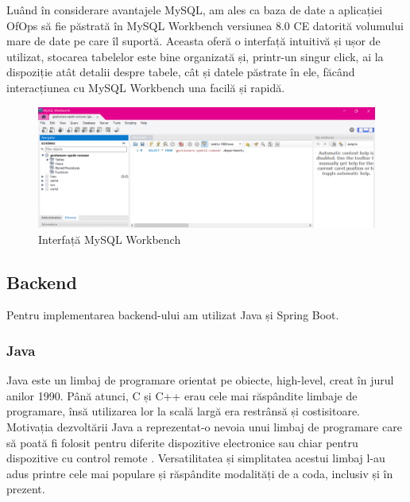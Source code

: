 Luând în considerare avantajele MySQL, am ales ca baza de date a aplicației OfOps să fie păstrată în MySQL Workbench versiunea 8.0 CE datorită volumului mare de date pe care îl suportă. Aceasta oferă o interfață intuitivă și ușor de utilizat, stocarea tabelelor este bine organizată și, printr-un singur click, ai la dispoziție atât detalii despre tabele, cât și datele păstrate în ele, făcând interacțiunea cu MySQL Workbench una facilă și rapidă.


\begin{figure}[!htb]
    \centering
    \includegraphics[width=0.9\linewidth]{images/interfata-mysql.png}
    \caption{Interfață MySQL Workbench}
    \label{fig:interfata-mysql}
\end{figure}


\subsection{Backend}
Pentru implementarea backend-ului am utilizat Java și Spring Boot. 

\begin{minipage}{\textwidth}
\hfill
\begin{minipage}{0.9\textwidth}
\subsubsection{Java}
\end{minipage}
\end{minipage}

\hspace{0cm} Java este un limbaj de programare orientat pe obiecte, high-level, creat în jurul anilor 1990. Până atunci, C și C++ erau cele mai răspândite limbaje de programare, însă utilizarea lor la scală largă era restrânsă și costisitoare. Motivația dezvoltării Java a reprezentat-o nevoia unui limbaj de programare care să poată fi folosit pentru diferite dispozitive electronice sau chiar pentru dispozitive cu control remote \cite{citation3}. Versatilitatea și simplitatea acestui limbaj l-au adus printre cele mai populare și răspândite modalități de a coda, inclusiv și în prezent. 

